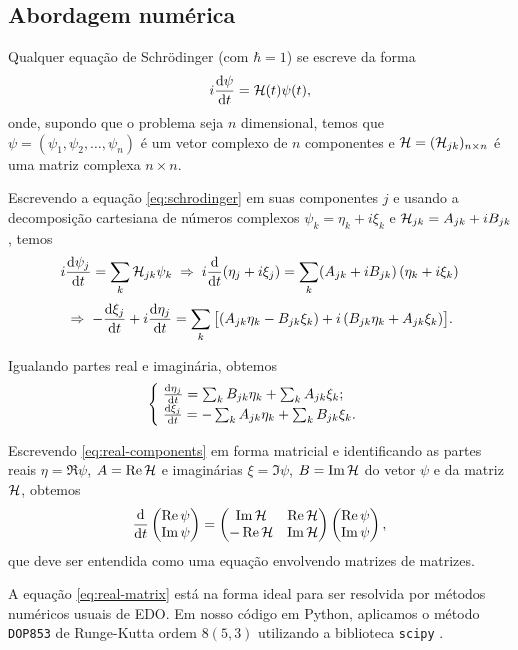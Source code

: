 \documentclass[12pt]{report}
\begin{document}
\begin{appendices}

\chapter{Abordagem numérica} \label{sec:numeric}

Qualquer equação de Schrödinger (com $\hbar = 1$) se escreve da forma
\begin{equation} \label{eq:schrodinger}
i \dv{\psi}{t}(t) = \mathcal{H}(t) \psi(t),
\end{equation}
onde, supondo que o problema seja $n$ dimensional, temos que $\psi = (\psi_1, \psi_2, \ldots, \psi_n)$ é um vetor complexo de $n$ componentes e $\mathcal{H} = (\mathcal{H}_{jk})_{n \times n}$ é uma matriz complexa $n \times n$.

Escrevendo a equação \ref{eq:schrodinger} em suas componentes $j$ e usando a decomposição cartesiana de números complexos $\psi_k = \eta_k + i \xi_k$ e $\mathcal{H}_{jk} = A_{jk} + i B_{jk}$, temos
$$
i \dv{\psi_j}{t} = \sum_k \mathcal{H}_{jk} \psi_k \; \Rightarrow \; i \dv{t}(\eta_j + i \xi_j) = \sum_k (A_{jk} + i B_{jk}) \, (\eta_k + i \xi_k)
$$
$$
\; \Rightarrow \; - \dv{\xi_j}{t} + i \dv{\eta_j}{t} =
\sum_k \big[ (A_{jk} \eta_k - B_{jk} \xi_k) +
i \, (B_{jk} \eta_k + A_{jk} \xi_k) \big] .
$$

Igualando partes real e imaginária, obtemos
\begin{equation} \label{eq:real-components}
\begin{cases}
\; \dv{\eta_j}{t} = \sum_k B_{jk} \eta_k  + \sum_k A_{jk} \xi_k; \\
\; \dv{\xi_j}{t}  = - \sum_k A_{jk} \eta_k  + \sum_k B_{jk} \xi_k.
\end{cases}
\end{equation}

Escrevendo \ref{eq:real-components} em forma matricial e identificando as partes reais $\eta = \Re\psi$, $A = \Re\mathcal{H}$ e imaginárias $\xi = \Im\psi$, $B = \Im\mathcal{H}$ do vetor $\psi$ e da matriz $\mathcal{H}$, obtemos
\begin{equation} \label{eq:real-matrix}
\dv{t}
\begin{pmatrix}
\Re \psi \\ \Im \psi
\end{pmatrix}
=
\begin{pmatrix}
\Im\mathcal{H} & \Re\mathcal{H} \\
-\Re\mathcal{H} & \Im\mathcal{H}
\end{pmatrix}
\begin{pmatrix}
\Re \psi \\ \Im \psi
\end{pmatrix},
\end{equation}
que deve ser entendida como uma equação envolvendo matrizes de matrizes.

A equação \ref{eq:real-matrix} está na forma ideal para ser resolvida por métodos numéricos usuais de EDO. Em nosso código em Python, aplicamos o método \texttt{DOP853} de Runge-Kutta ordem $8(5, 3)$ utilizando a biblioteca \texttt{scipy} \cite{scipy}.

\end{appendices}
\end{document}

